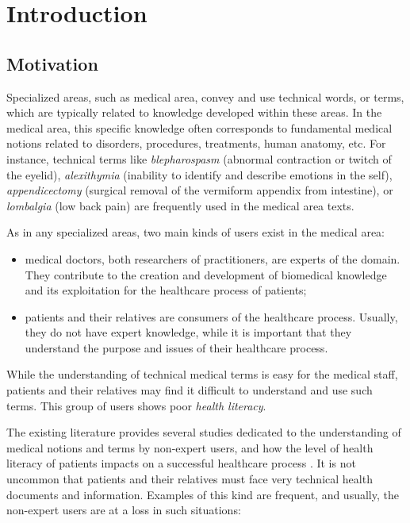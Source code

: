 \chapter{Introduction}

\section{Motivation}
Specialized areas, such as medical area, convey and use technical words, or terms, which are typically related to knowledge developed within these areas. In the medical area, this specific knowledge often corresponds to fundamental medical notions related to disorders, procedures, treatments, human anatomy, etc. For instance, technical terms like \textit{blepharospasm} (abnormal contraction or twitch of the eyelid), \textit{alexithymia} (inability to identify and describe emotions in the self), \textit{appendicectomy} (surgical removal of the vermiform appendix from intestine), or \textit{lombalgia} (low back pain) are frequently used in the medical area texts.

As in any specialized areas, two main kinds of users exist in the medical area:

\begin{itemize}
    \item medical doctors, both researchers of practitioners, are experts of the domain. They contribute to the creation and development of biomedical knowledge and its exploitation for the healthcare process of patients;
    
    \item patients and their relatives are consumers of the healthcare process. Usually, they do not have expert knowledge, while it is important that they understand the purpose and issues of their healthcare process. 
\end{itemize}
While the understanding of technical medical terms is easy for the medical staff, patients and their relatives may find it difficult to understand and use such terms. This group of users shows poor \textit{health literacy}. 

The existing literature provides several studies dedicated to the understanding of medical notions and terms by non-expert users, and how the level of health literacy of patients impacts on a successful healthcare process \citep{McCray-JAMIA2005, Eysenbach-JMIR2007}. It is not uncommon that patients and their relatives must face very technical health documents and information. Examples of this kind are frequent, and usually, the non-expert users are at a loss in such situations:

